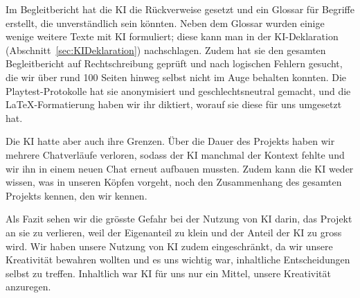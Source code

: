 \documentclass[../Main.tex]{subfiles}
\begin{document}
Im Begleitbericht hat die KI die Rückverweise gesetzt und ein Glossar für Begriffe erstellt, die unverständlich sein könnten. Neben dem Glossar wurden einige wenige weitere Texte mit KI formuliert; diese kann man in der KI-Deklaration (Abschnitt~\ref{sec:KIDeklaration}) nachschlagen. Zudem hat sie den gesamten Begleitbericht auf Rechtschreibung geprüft und nach logischen Fehlern gesucht, die wir über rund 100 Seiten hinweg selbst nicht im Auge behalten konnten. Die Playtest-Protokolle hat sie anonymisiert und geschlechtsneutral gemacht, und die \LaTeX-Formatierung haben wir ihr diktiert, worauf sie diese für uns umgesetzt hat.

Die KI hatte aber auch ihre Grenzen. Über die Dauer des Projekts haben wir mehrere Chatverläufe verloren, sodass der KI manchmal der Kontext fehlte und wir ihn in einem neuen Chat erneut aufbauen mussten. Zudem kann die KI weder wissen, was in unseren Köpfen vorgeht, noch den Zusammenhang des gesamten Projekts kennen, den wir kennen.

Als Fazit sehen wir die grösste Gefahr bei der Nutzung von KI darin, das Projekt an sie zu verlieren, weil der Eigenanteil zu klein und der Anteil der KI zu gross wird. Wir haben unsere Nutzung von KI zudem eingeschränkt, da wir unsere Kreativität bewahren wollten und es uns wichtig war, inhaltliche Entscheidungen selbst zu treffen. Inhaltlich war KI für uns nur ein Mittel, unsere Kreativität anzuregen.
\end{document}
